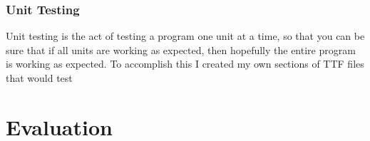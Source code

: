 \documentclass{report}
\begin{document}
\subsection{Unit Testing}

Unit testing is the act of testing a program one unit at a time, so that you can
be sure that if all units are working as expected, then hopefully the entire
program is working as expected. To accomplish this I created my own sections of
TTF files that would test 

\chapter{Evaluation}
\end{document}
